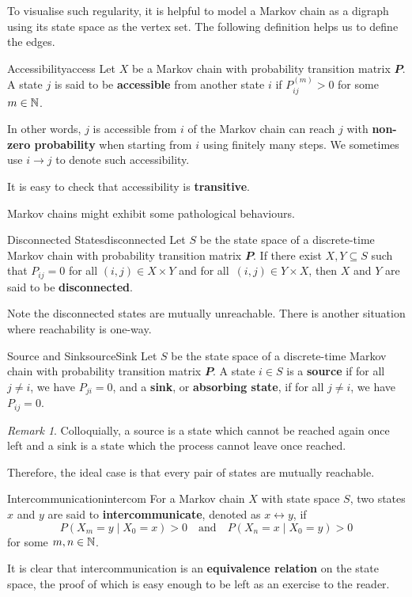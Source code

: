 \documentclass[math, code]{amznotes}
\theoremstyle{remark}
\newtheorem*{remark}{Remark}
\begin{document}
To visualise such regularity, it is helpful to model a Markov chain as a digraph using its state space as the vertex set. The following definition helps us to define the edges.
\begin{dfnbox}{Accessibility}{access}
    Let $X$ be a Markov chain with probability transition matrix $\mathbfit{P}$. A state $j$ is said to be {\color{red} \textbf{accessible}} from another state $i$ if $P^{\left(m\right)}_{ij} > 0$ for some $m \in \mathbb{N}$.
\end{dfnbox}
In other words, $j$ is accessible from $i$ of the Markov chain can reach $j$ with \textbf{non-zero probability} when starting from $i$ using finitely many steps. We sometimes use $i \to j$ to denote such accessibility.

It is easy to check that accessibility is \textbf{transitive}.

Markov chains might exhibit some pathological behaviours.
\begin{dfnbox}{Disconnected States}{disconnected}
    Let $S$ be the state space of a discrete-time Markov chain with probability transition matrix $\mathbfit{P}$. If there exist $X, Y \subseteq S$ such that $P_{ij} = 0$ for all $\left(i, j\right) \in X \times Y$ and for all~$\left(i, j\right) \in Y \times X$, then $X$ and $Y$ are said to be {\color{red} \textbf{disconnected}}. 
\end{dfnbox}
Note the disconnected states are mutually unreachable. There is another situation where reachability is one-way.
\begin{dfnbox}{Source and Sink}{sourceSink}
    Let $S$ be the state space of a discrete-time Markov chain with probability transition matrix $\mathbfit{P}$. A state $i \in S$ is a {\color{red} \textbf{source}} if for all $j \neq i$, we have $P_{ji} = 0$, and a {\color{red} \textbf{sink}}, or {\color{red} \textbf{absorbing state}}, if for all $j \neq i$, we have $P_{ij} = 0$.
\end{dfnbox}
\begin{notebox}
    \begin{remark}
        Colloquially, a source is a state which cannot be reached again once left and a sink is a state which the process cannot leave once reached.
    \end{remark}
\end{notebox}
Therefore, the ideal case is that every pair of states are mutually reachable.
\begin{dfnbox}{Intercommunication}{intercom}
    For a Markov chain $X$ with state space $S$, two states $x$ and $y$ are said to {\color{red} \textbf{intercommunicate}}, denoted as $x \leftrightarrow y$, if 
    \begin{equation*}
        P\left(X_m = y \mid X_0 = x\right) > 0 \quad\textrm{and}\quad P\left(X_n = x \mid X_0 = y\right) > 0
    \end{equation*}
    for some $m, n \in \mathbb{N}$.
\end{dfnbox}
It is clear that intercommunication is an \textbf{equivalence relation} on the state space, the proof of which is easy enough to be left as an exercise to the reader. 
\end{document}
